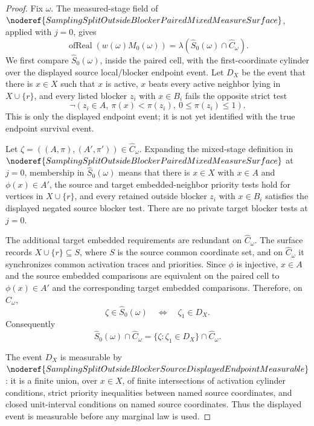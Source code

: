 \begin{proof}
Fix \(\omega\).  The measured-stage field of
\(\noderef{SamplingSplitOutsideBlockerPairedMixedMeasureSurface}\), applied
with \(j=0\), gives
\[
  \operatorname{ofReal}(w(\omega)M_0(\omega))
  =
  \lambda(\widehat S_0(\omega)\cap\widehat C_\omega).
\]
We first compare \(\widehat S_0(\omega)\), inside the paired cell, with the
first-coordinate cylinder over the displayed source local/blocker endpoint
event.  Let \(D_X\) be the event that there is \(x\in X\) such that \(x\) is
active, \(x\) beats every active neighbor lying in \(X\cup\{r\}\), and every
listed blocker \(z_i\) with \(x\in B_i\) fails the opposite strict test
\[
  \neg(z_i\in A,\ \pi(x)<\pi(z_i),\ 0\le \pi(z_i)\le1).
\]
This is only the displayed endpoint event; it is not yet identified with the
true endpoint survival event.

Let \(\zeta=((A,\pi),(A',\pi'))\in\widehat C_\omega\).  Expanding the
mixed-stage definition in
\(\noderef{SamplingSplitOutsideBlockerPairedMixedMeasureSurface}\) at
\(j=0\), membership in \(\widehat S_0(\omega)\) means that there is \(x\in X\)
with \(x\in A\) and \(\phi(x)\in A'\), the source and target embedded-neighbor
priority tests hold for vertices in \(X\cup\{r\}\), and every retained outside
blocker \(z_i\) with \(x\in B_i\) satisfies the displayed negated source
blocker test.  There are no private target blocker tests at \(j=0\).

The additional target embedded requirements are redundant on
\(\widehat C_\omega\).  The surface records \(X\cup\{r\}\subseteq S\), where
\(S\) is the source common coordinate set, and on \(\widehat C_\omega\) it
synchronizes common activation traces and priorities.  Since \(\phi\) is
injective, \(x\in A\) and the source embedded comparisons are equivalent on
the paired cell to \(\phi(x)\in A'\) and the corresponding target embedded
comparisons.  Therefore, on \(\widehat C_\omega\),
\[
  \zeta\in\widehat S_0(\omega)
  \quad\Longleftrightarrow\quad
  \zeta_1\in D_X .
\]
Consequently
\[
  \widehat S_0(\omega)\cap\widehat C_\omega
  =
  \{\zeta:\zeta_1\in D_X\}\cap\widehat C_\omega .
\]

The event \(D_X\) is measurable by
\(\noderef{SamplingSplitOutsideBlockerSourceDisplayedEndpointMeasurable}\):
it is a finite union, over \(x\in X\), of finite intersections of activation
cylinder conditions, strict priority inequalities between named source
coordinates, and closed unit-interval conditions on named source coordinates.
Thus the displayed event is measurable before any marginal law is used.


\end{proof}
